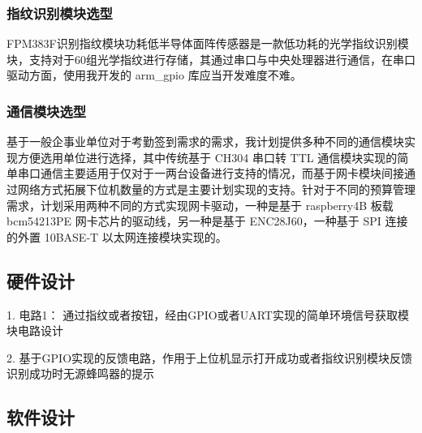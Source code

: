 \subsubsection{指纹识别模块选型}
FPM383F识别指纹模块功耗低半导体面阵传感器是一款低功耗的光学指纹识别模块，支持对于60组光学指纹进行存储，其通过串口与中央处理器进行通信，在串口驱动方面，使用我开发的 arm\_gpio 库应当开发难度不难。

\subsubsection{通信模块选型}

基于一般企事业单位对于考勤签到需求的需求，我计划提供多种不同的通信模块实现方便选用单位进行选择，其中传统基于 CH304 串口转 TTL 通信模块实现的简单串口通信主要适用于仅对于一两台设备进行支持的情况，而基于网卡模块间接通过网络方式拓展下位机数量的方式是主要计划实现的支持。针对于不同的预算管理需求，计划采用两种不同的方式实现网卡驱动，一种是基于 raspberry4B 板载 bcm54213PE 网卡芯片的驱动线，另一种是基于 ENC28J60，一种基于 SPI 连接的外置 10BASE-T 以太网连接模块实现的。

\subsection{硬件设计}

1. 电路1： 
通过指纹或者按钮，经由GPIO或者UART实现的简单环境信号获取模块电路设计

2. 基于GPIO实现的反馈电路，作用于上位机显示打开成功或者指纹识别模块反馈识别成功时无源蜂鸣器的提示

\subsection{软件设计}